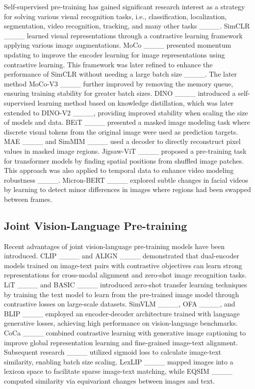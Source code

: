 Self-supervised pre-training has gained significant research interest as a strategy for solving various visual recognition tasks, i.e., classification, localization, segmentation, video recognition, tracking, and many other tasks ____.
SimCLR ____ learned visual representations through a contrastive learning framework applying various image augmentations.
MoCo ____ presented momentum updating to improve the encoder learning for image representations using contrastive learning. 
This framework was later refined to enhance the performance of SimCLR without needing a large batch size ____.
The later method MoCo-V3 ____ further improved by removing the memory queue, ensuring training stability for greater batch sizes.
DINO ____ introduced a self-supervised learning method based on knowledge distillation, which was later extended to DINO-V2 ____, providing improved stability when scaling the size of models and data.
BEiT ____ presented a masked image modeling task where discrete visual tokens from the original image were used as prediction targets.
MAE ____ and SimMIM ____ used a decoder to directly reconstruct pixel values in masked image regions. 
Jigsaw-ViT ____ proposed a pre-training task for transformer models by finding spatial positions from shuffled image patches.
This approach was also applied to temporal data to enhance video modeling robustness ____.
Micron-BERT ____ explored subtle changes in facial videos by learning to detect minor differences in images where regions had been swapped between frames.

\subsection{Joint Vision-Language Pre-training}
Recent advantages of joint vision-language pre-training models have been introduced.
CLIP ____ and ALIGN ____ demonstrated that dual-encoder models trained on image-text pairs with contrastive objectives can learn strong representations for cross-modal alignment and zero-shot image recognition tasks.
LiT ____ and BASIC ____ introduced zero-shot transfer learning techniques by training the text model to learn from the pre-trained image model through contrastive losses on large-scale datasets.
SimVLM ____, OFA ____, and BLIP ____ employed an encoder-decoder architecture trained with language generative losses, achieving high performance on vision-language benchmarks.
CoCa ____ combined contrastive learning with generative image captioning to improve global representation learning and fine-grained image-text alignment.
Subsequent research ____ utilized sigmoid loss to calculate image-text similarity, enabling batch size scaling.
LexLIP ____ mapped images into a lexicon space to facilitate sparse image-text matching, while EQSIM ____ computed similarity via equivariant changes between images and text.

